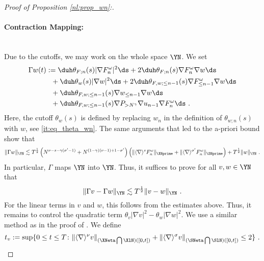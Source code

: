 \documentclass[11pt]{article}
\begin{document}
\begin{proof}[Proof of Proposition \ref{nl:prop_wn}:]
\paragraph{Contraction Mapping:} ~\\
Due to the cutoffs, we may work on the whole space \( \YN \). We set
\begin{align*}
\Gamma w(t)&:=
\duh  \theta_{F;n}(s) |\nabla F_n^\omega|^2\ds  
		+2 \duh \theta_{F;n}(s) \nabla F_n^\omega \nabla w \ds \\
		&~~+ \duh \theta_{w}(s) |\nabla w|^2\ds
		+ 2 \duh \theta_{F,w;\leq n-1}(s) \nabla F_{\leq n-1}^\omega \nabla w \ds \\
		&~~+ \duh \theta_{F,w;\leq n-1}(s) \nabla w_{\leq n-1} \nabla w \ds \\
		&~~ + \duh \theta_{F,w;\leq n-1}(s) \nabla P_{>N^\gamma} \nabla u_{n-1} \nabla F_n^\omega \ds ~. 
\end{align*}
Here, the cutoff \( \theta_w(s) \) is defined by replacing \( w_n \) in the definition of \( \theta_{w;n}(s) \) with \( w \), see \eqref{it:eq_theta_wn}. The same arguments that led to the a-priori bound show that 
\begin{equation*}
\| \Gamma w \|_{\YN} \lesssim  T^{\frac{1}{2}} \left( N^{\nu-s-\gamma(\sigma^\prime-1)}+ N^{(1-\gamma)(\nu-1)+1-\sigma^\prime} \right) \left( \| \langle \nabla \rangle^s F_n^\omega \|_{\XNprime}+ \| \langle \nabla \rangle^{\sigma^\prime} F_n^\omega \|_{\SNprime}\right) + T^{\frac{1}{2}} \| w \|_{\YN}~. 
\end{equation*}
In particular, \( \Gamma \) maps \( \YN \) into \( \YN \). Thus, it suffices to prove for all \( v,w\in \YN \) that 
\begin{equation*}
\| \Gamma v - \Gamma w \|_{\YN} \lesssim T^{\frac{1}{2}} \| v - w \|_{\YN}~. 
\end{equation*}
For the linear terms in \( v \) and \( w \), this follows from the estimates above. Thus, it remains to control the quadratic term \( \theta_{v} |\nabla v|^2 - \theta_{w} |\nabla w|^2 \). We use a similar method as in the proof of \cite[Proposition 3.1]{BD99}. We define
\begin{equation*}
t_v := \sup\{ 0 \leq t \leq T\colon \| \langle \nabla \rangle^\nu v \|_{(\XNeta \bigcap \XlN)([0,t])} + \| \langle \nabla \rangle^{\sigma} v \|_{(\SNeta \bigcap \SlN)([0,t])}\leq 2 \}~. 
\end{equation*}


\end{proof}
\end{document}
